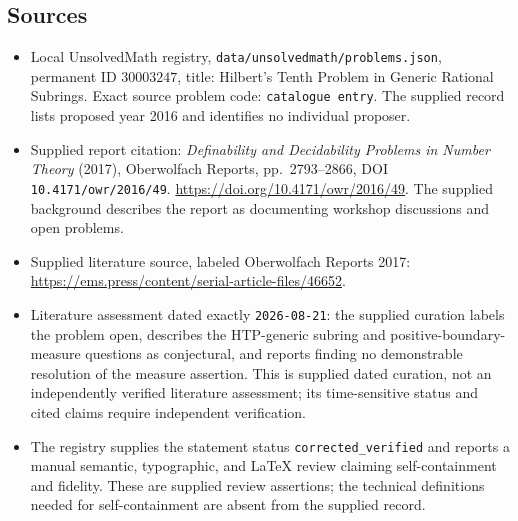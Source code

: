 \documentclass[11pt]{article}
\begin{document}
\subsection{Sources}
\begin{itemize}
\item Local UnsolvedMath registry, \texttt{data/unsolvedmath/problems.json}, permanent ID \(30003247\), title: Hilbert's Tenth Problem in Generic Rational Subrings. Exact source problem code: \texttt{catalogue entry}. The supplied record lists proposed year 2016 and identifies no individual proposer.
\item Supplied report citation: \emph{Definability and Decidability Problems in Number Theory} (2017), Oberwolfach Reports, pp.\ 2793--2866, DOI \texttt{10.4171/owr/2016/49}. \url{https://doi.org/10.4171/owr/2016/49}. The supplied background describes the report as documenting workshop discussions and open problems.
\item Supplied literature source, labeled Oberwolfach Reports 2017: \url{https://ems.press/content/serial-article-files/46652}.
\item Literature assessment dated exactly \texttt{2026-08-21}: the supplied curation labels the problem open, describes the HTP-generic subring and positive-boundary-measure questions as conjectural, and reports finding no demonstrable resolution of the measure assertion. This is supplied dated curation, not an independently verified literature assessment; its time-sensitive status and cited claims require independent verification.
\item The registry supplies the statement status \texttt{corrected\_verified} and reports a manual semantic, typographic, and LaTeX review claiming self-containment and fidelity. These are supplied review assertions; the technical definitions needed for self-containment are absent from the supplied record.
\end{itemize}
\end{document}
